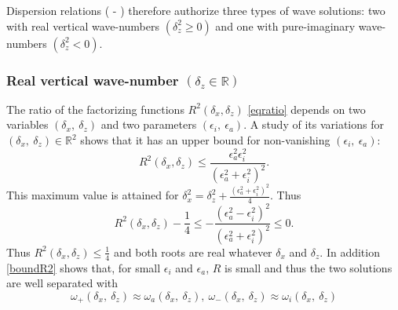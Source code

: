 \documentclass[a4paper,11pt]{article}
\begin{document}
Dispersion relations ( - ) therefore authorize three types of wave solutions: two with real vertical wave-numbers $(\delta_z^2\geq0)$ and one with pure-imaginary wave-numbers $(\delta_z^2<0)$.

\subsubsection{Real vertical wave-number $(\delta_z\in\mathbb{R})$}

The ratio of the factorizing functions $\displaystyle R^2(\delta_x,\delta_z)$ \ref{eqratio} depends on two variables $(\delta_x,\ \delta_z)$ and two parameters $(\epsilon_i,\ \epsilon_a)$. A study of its variations for $(\delta_x,\ \delta_z)\in \mathbb{R}^2$ shows that it has an upper bound for non-vanishing $(\epsilon_i,\ \epsilon_a)$:
\begin{equation}
	 R^2(\delta_x,\delta_z) \leq
	\frac{\epsilon_a^2\epsilon_i^2}{\left
	(\epsilon_a^2+\epsilon_i^2
	\right)^2}.
\label{boundR2}
\end{equation}
This maximum value is attained for $\delta_x^2=\delta_z^2+\frac{(\epsilon_a^2+\epsilon_i^2)^2}{4}$.
Thus
\[
 R^2(\delta_x,\delta_z)-
\frac{1}{4}
\le 
-\frac{\left(\epsilon_a^2-\epsilon_i^2
	\right)^2}{\left( \epsilon_a^2+\epsilon_i^2
	\right)^2}\le 0.
\]
Thus $\displaystyle R^2(\delta_x,\delta_z)\le \frac{1}{4}$
and both roots are real whatever $\delta_x$ and $\delta_z$.
In addition \ref{boundR2} shows that, for small $\epsilon_i$ and $\epsilon_a$, $R$ is small and thus the two solutions are well separated with 
%
\begin{equation}
	\omega_{+}(\delta_x,\ \delta_z) \approx \omega_a(\delta_x,\ \delta_z),\ 
	\omega_{-}(\delta_x,\ \delta_z) \approx \omega_i
	(\delta_x,\ \delta_z)
\end{equation}
\end{document}

